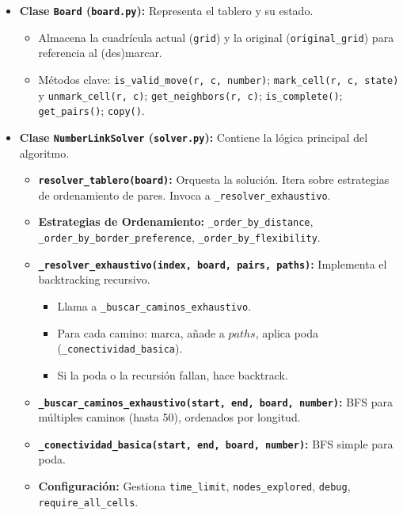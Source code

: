 \documentclass[spanish]{article}
\numberwithin{equation}{section}
\numberwithin{figure}{section}
\theoremstyle{definition}
\begin{document}
\begin{itemize}
    \item \textbf{Clase \texttt{Board} (\texttt{board.py}):} Representa el tablero y su estado.
        \begin{itemize}
            \item Almacena la cuadrícula actual (\texttt{grid}) y la original (\texttt{original\_grid}) para referencia al (des)marcar.
            \item Métodos clave: \texttt{is\_valid\_move(r, c, number)}; \texttt{mark\_cell(r, c, state)} y \texttt{unmark\_cell(r, c)}; \texttt{get\_neighbors(r, c)}; \texttt{is\_complete()}; \texttt{get\_pairs()}; \texttt{copy()}.
        \end{itemize}

    \item \textbf{Clase \texttt{NumberLinkSolver} (\texttt{solver.py}):} Contiene la lógica principal del algoritmo.
        \begin{itemize}
            \item \textbf{\texttt{resolver\_tablero(board)}:} Orquesta la solución. Itera sobre estrategias de ordenamiento de pares. Invoca a \texttt{\_resolver\_exhaustivo}.
            \item \textbf{Estrategias de Ordenamiento:} \texttt{\_order\_by\_distance}, \texttt{\_order\_by\_border\_preference}, \texttt{\_order\_by\_flexibility}.
            \item \textbf{\texttt{\_resolver\_exhaustivo(index, board, pairs, paths)}:} Implementa el backtracking recursivo.
                \begin{itemize}
                    \item Llama a \texttt{\_buscar\_caminos\_exhaustivo}.
                    \item Para cada camino: marca, añade a $paths$, aplica poda (\texttt{\_conectividad\_basica}).
                    \item Si la poda o la recursión fallan, hace backtrack.
                \end{itemize}
            \item \textbf{\texttt{\_buscar\_caminos\_exhaustivo(start, end, board, number)}:} BFS para múltiples caminos (hasta 50), ordenados por longitud.
            \item \textbf{\texttt{\_conectividad\_basica(start, end, board, number)}:} BFS simple para poda.
            \item \textbf{Configuración:} Gestiona \texttt{time\_limit}, \texttt{nodes\_explored}, \texttt{debug}, \texttt{require\_all\_cells}.
        \end{itemize}


\end{itemize}
\end{document}
